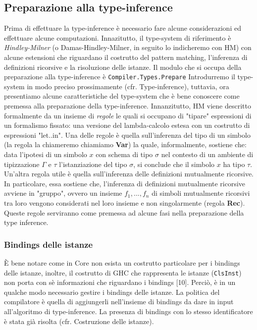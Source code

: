 \documentclass[10pt,a4paper]{article}
\begin{document}
\subsection{Preparazione alla type-inference}
Prima di effettuare la type-inference è necessario fare alcune considerazioni ed effettuare alcune computazioni.
Innazitutto, il type-system di riferimento è \textit{Hindley-Milner} (o Damas-Hindley-Milner, in seguito lo indicheremo con HM)
con alcune estensioni che riguardano il costrutto del pattern matching, l'inferenza di definizioni ricorsive e la
risoluzione delle istanze. Il modulo che si occupa della preparazione alla type-inference è \texttt{Compiler.Types.Prepare}
Introdurremo il type-system in modo preciso prossimamente (cfr. Type-inference), tuttavia, ora presentiamo alcune
caratteristiche del type-system che è bene conoscere come premessa alla preparazione della type-inference.
Innanzitutto, HM viene descritto formalmente da un insieme di \textit{regole} le quali si occupano di "tipare"
espressioni di un formalismo fissato: una versione del lambda-calcolo estesa con un costrutto di espressioni "let..in".
Una delle regole è quella sull'inferenza del tipo di un simbolo (la regola la chiameremo chiamiamo \textbf{Var})
la quale, informalmente, sostiene che: data l'ipotesi di un simbolo $ x $ con schema di tipo $ \sigma $ nel contesto di
un ambiente di tipizzazione $ \Gamma $ e $ \tau $ l'istanziazione del tipo $ \sigma $, si conclude che il simbolo
$ x $ ha tipo $ \tau $.
Un'altra regola utile è quella
sull'inferenza delle definizioni mutualmente ricorsive. In particolare, essa sostiene che, l'inferenza di definizioni
mutualmente ricorsive avviene in "gruppo", ovvero un insieme $ {f_1, ..., f_n} $ di simboli mutualmente ricorsivi
tra loro vengono considerati nel loro insieme e non singolarmente (regola \textbf{Rec}).
Queste regole serviranno come premessa ad alcune fasi nella preparazione della type inference.

\subsubsection{Bindings delle istanze}
\`E bene notare come in Core non esista un costrutto particolare per i bindings delle istanze, inoltre, il
costrutto di GHC che rappresenta le istanze (\texttt{ClsInst}) non porta con sè informazioni che riguardano i
bindings [10].
Perciò, è in un qualche modo necessario gestire i bindings delle istanze. La politica del compilatore è quella di
aggiungerli nell'insieme di bindings da dare in input all'algoritmo di type-inference. La presenza di bindings con lo
stesso identificatore è stata già risolta (cfr. Costruzione delle istanze).
\end{document}
